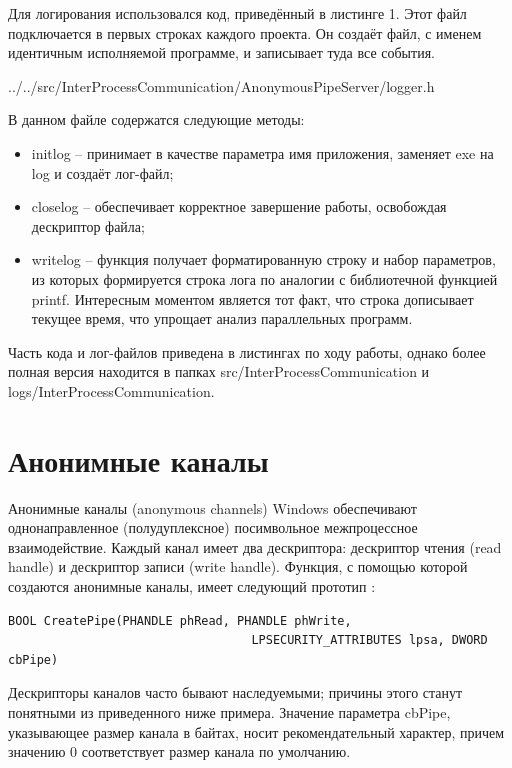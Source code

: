 \documentclass[a4paper, 12pt]{report}		%
\begin{document}
Для логирования использовался код, приведённый в листинге 1. Этот файл подключается в первых строках каждого проекта. Он создаёт файл, с именем идентичным исполняемой программе, и записывает туда все события.
\newpage


{../../src/InterProcessCommunication/AnonymousPipeServer/logger.h}

В данном файле содержатся следующие методы:
\begin{itemize}
\item initlog -- принимает в качестве параметра имя приложения, заменяет exe на log и создаёт лог-файл;
\item closelog -- обеспечивает корректное завершение работы, освобождая дескриптор файла;
\item writelog -- функция получает форматированную строку и набор параметров, из которых формируется строка лога по аналогии с библиотечной функцией printf. Интересным моментом является тот факт, что строка дописывает текущее время, что упрощает анализ параллельных программ.
\end{itemize}

\vspace{1em}
Часть кода и лог-файлов приведена в листингах по ходу работы, однако более полная версия находится в папках src/InterProcessCommunication и logs/InterProcessCommunication.

\chapter*{Анонимные каналы}

Анонимные каналы (anonymous channels) Windows обеспечивают однонаправленное (полудуплексное) посимвольное межпроцессное взаимодействие. Каждый канал имеет два дескриптора: дескриптор чтения (read handle) и дескриптор записи (write handle). Функция, с помощью которой создаются анонимные каналы, имеет следующий прототип \cite{Dushutina,Hart}:

\begin{verbatim}
BOOL CreatePipe(PHANDLE phRead, PHANDLE phWrite,
                                  LPSECURITY_ATTRIBUTES lpsa, DWORD cbPipe)
\end{verbatim}

Дескрипторы каналов часто бывают наследуемыми; причины этого станут понятными из приведенного ниже примера. Значение параметра cbPipe, указывающее размер канала в байтах, носит рекомендательный характер, причем значению 0 соответствует размер канала по умолчанию.
\end{document}
